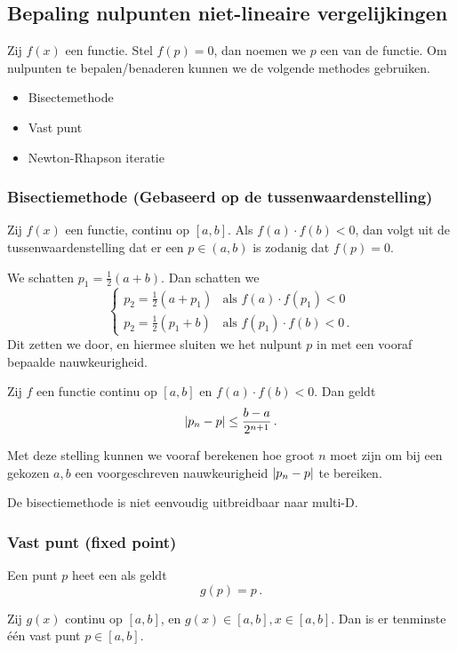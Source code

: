 \documentclass{2wn20summary}
\begin{document}
		\subsection{Bepaling nulpunten niet-lineaire vergelijkingen}
			Zij $f(x)$ een functie. Stel $ f(p) = 0 $, dan noemen we $p$ een  van de functie. Om nulpunten te bepalen/benaderen kunnen we de volgende methodes gebruiken.
			\begin{itemize}
				\item Bisectemethode
				\item Vast punt %
				\item Newton-Rhapson iteratie
			\end{itemize}
			\subsubsection{Bisectiemethode \textmd{(Gebaseerd op de tussenwaardenstelling)}}
				Zij $f(x)$ een functie, continu op $ [a,b] $. Als $ f(a)\cdot f(b) < 0 $, dan volgt uit de tussenwaardenstelling dat er een $p \in (a,b)$ is zodanig dat $ f(p)=0 $. 
				
				We schatten $p_1=\frac{1}{2}(a+b)$. Dan schatten we 
				\[ 
					\begin{cases}
						p_2 = \frac{1}{2}(a+p_1) & \text{als } f(a)\cdot f(p_1)<0 \\
						p_2 = \frac{1}{2}(p_1+b) & \text{als } f(p_1)\cdot f(b)<0\,.
					\end{cases}
				\]
				Dit zetten we door, en hiermee sluiten we het nulpunt $p$ in met een vooraf bepaalde nauwkeurigheid. 
				
				\begin{theorem}
					Zij $f$ een functie continu op $[a,b]$ en $ f(a)\cdot f(b) <0 $. Dan geldt 
					\[ 
						{\left|p_n-p\right|} \le \frac{b-a}{2^{n+1}}\,.
					\]
				\end{theorem}
				Met deze stelling kunnen we vooraf berekenen hoe groot $n$ moet zijn om bij een gekozen $a, b$ een voorgeschreven nauwkeurigheid $ {\left|p_n-p\right|} $ te bereiken.
				
				\begin{opm}
					De bisectiemethode is niet eenvoudig uitbreidbaar naar multi-D.
				\end{opm}
				
			\subsubsection{Vast punt (fixed point)}
				Een punt $p$ heet een  als geldt
				\[ 
					g(p)=p\,.
				\]
				\begin{theonum}\label{10-1}
					Zij $g(x)$ continu op $ [a,b] $, en $ g(x) \in [a,b], x \in [a,b] $. Dan is er tenminste \'e\'en vast punt $ p \in [a,b] $.
				\end{theonum}
				
\end{document}
